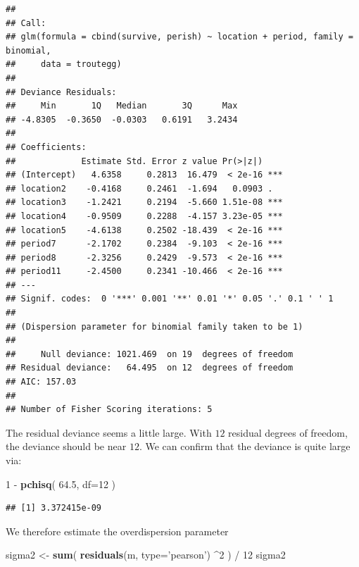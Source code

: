 \documentclass[]{book}
\newenvironment{Shaded}{\begin{snugshade}}{\end{snugshade}}
\newcommand{\KeywordTok}[1]{\textcolor[rgb]{0.13,0.29,0.53}{\textbf{{#1}}}}
\newcommand{\DataTypeTok}[1]{\textcolor[rgb]{0.13,0.29,0.53}{{#1}}}
\newcommand{\DecValTok}[1]{\textcolor[rgb]{0.00,0.00,0.81}{{#1}}}
\newcommand{\FloatTok}[1]{\textcolor[rgb]{0.00,0.00,0.81}{{#1}}}
\newcommand{\StringTok}[1]{\textcolor[rgb]{0.31,0.60,0.02}{{#1}}}
\newcommand{\NormalTok}[1]{{#1}}
\theoremstyle{definition}
\theoremstyle{definition}
\theoremstyle{remark}
\begin{document}
\begin{verbatim}
## 
## Call:
## glm(formula = cbind(survive, perish) ~ location + period, family = binomial, 
##     data = troutegg)
## 
## Deviance Residuals: 
##     Min       1Q   Median       3Q      Max  
## -4.8305  -0.3650  -0.0303   0.6191   3.2434  
## 
## Coefficients:
##             Estimate Std. Error z value Pr(>|z|)    
## (Intercept)   4.6358     0.2813  16.479  < 2e-16 ***
## location2    -0.4168     0.2461  -1.694   0.0903 .  
## location3    -1.2421     0.2194  -5.660 1.51e-08 ***
## location4    -0.9509     0.2288  -4.157 3.23e-05 ***
## location5    -4.6138     0.2502 -18.439  < 2e-16 ***
## period7      -2.1702     0.2384  -9.103  < 2e-16 ***
## period8      -2.3256     0.2429  -9.573  < 2e-16 ***
## period11     -2.4500     0.2341 -10.466  < 2e-16 ***
## ---
## Signif. codes:  0 '***' 0.001 '**' 0.01 '*' 0.05 '.' 0.1 ' ' 1
## 
## (Dispersion parameter for binomial family taken to be 1)
## 
##     Null deviance: 1021.469  on 19  degrees of freedom
## Residual deviance:   64.495  on 12  degrees of freedom
## AIC: 157.03
## 
## Number of Fisher Scoring iterations: 5
\end{verbatim}

The residual deviance seems a little large. With \(12\) residual degrees
of freedom, the deviance should be near \(12\). We can confirm that the
deviance is quite large via:

\begin{Shaded}
\begin{Highlighting}[]
\DecValTok{1} \NormalTok{-}\StringTok{ }\KeywordTok{pchisq}\NormalTok{( }\FloatTok{64.5}\NormalTok{, }\DataTypeTok{df=}\DecValTok{12} \NormalTok{)}
\end{Highlighting}
\end{Shaded}

\begin{verbatim}
## [1] 3.372415e-09
\end{verbatim}

We therefore estimate the overdispersion parameter

\begin{Shaded}
\begin{Highlighting}[]
\NormalTok{sigma2 <-}\StringTok{ }\KeywordTok{sum}\NormalTok{( }\KeywordTok{residuals}\NormalTok{(m, }\DataTypeTok{type=}\StringTok{'pearson'}\NormalTok{) ^}\DecValTok{2} \NormalTok{) /}\StringTok{ }\DecValTok{12} 
\NormalTok{sigma2}
\end{Highlighting}
\end{Shaded}
\end{document}
